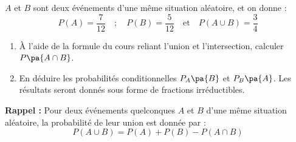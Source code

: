 \begin{exo}
	$A$ et $B$ sont deux événements d'une même situation aléatoire, et on donne :
	\[
		P(A) = \frac{7}{12} \quad ; \quad P(B) = \frac{5}{12} \quad \text{et} \quad P(A \cup B) = \frac{3}{4}
	\]

	\begin{enumerate}
		\item À l'aide de la formule du cours reliant l'union et l'intersection, calculer $P\pa{A \cap B}$.
		\item En déduire les probabilités conditionnelles $P_{A}\pa{B}$ et $P_{B}\pa{A}$. Les résultats seront donnés sous forme de fractions irréductibles.
	\end{enumerate}

	\noindent\textbf{Rappel :} Pour deux événements quelconques $A$ et $B$ d'une même situation aléatoire, la probabilité de leur union est donnée par :
	\[
		P(A \cup B) = P(A) + P(B) - P(A \cap B)
	\]

\end{exo}
